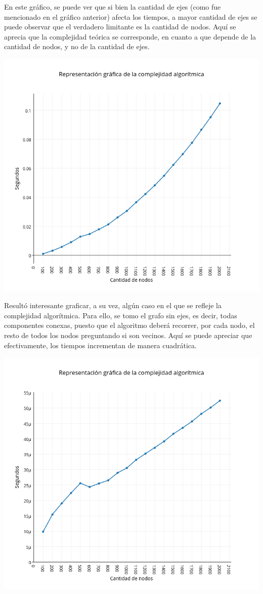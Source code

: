 En este gráfico, se puede ver que si bien la cantidad de ejes (como fue mencionado en el gráfico anterior) afecta los tiempos, a mayor cantidad de ejes se puede observar que el verdadero limitante es la cantidad de nodos. Aquí se aprecia que la complejidad teórica se corresponde, en cuanto a que depende de la cantidad de nodos, y no de la cantidad de ejes.

\includegraphics[width=15cm,keepaspectratio=yes]{imagenes/greedy/worst1.png}

Resultó interesante graficar, a su vez, algún caso en el que se refleje la complejidad algorítmica.
Para ello, se tomo el grafo sin ejes, es decir, todas componentes conexas, puesto que el algoritmo deberá recorrer, por cada nodo, el resto de todos los nodos preguntando si son vecinos.
Aquí se puede apreciar que efectivamente, los tiempos incrementan de manera cuadrática.

\includegraphics[width=15cm,keepaspectratio=yes]{imagenes/greedy/worst2.png}

